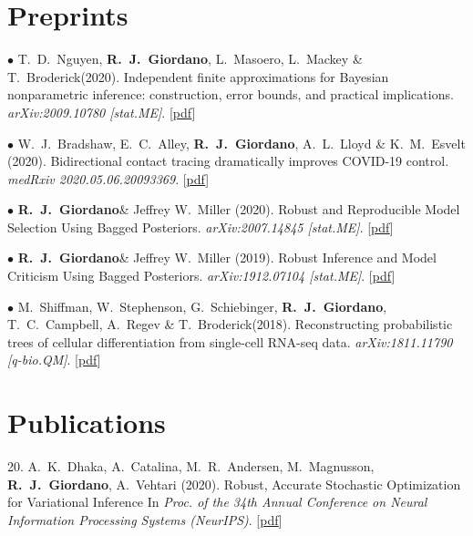 \documentclass[margin,line]{res}
\newcommand{\me}{\textbf{R.~J.~Giordano}\xspace}
\newcommand{\trevor}{T.~C.~Campbell\xspace}
\newcommand{\tamara}{T.~Broderick\xspace}
\newcommand{\paperref}[1]{[\href{#1}{pdf}]}
\newcommand{\paperref}[1]{}
\begin{document}
\begin{resume}
%
%


\section{\sc Preprints}

$\bullet$ T.~D.~Nguyen, \me, L.~Masoero, L.~Mackey \& \tamara (2020).
Independent finite approximations for Bayesian nonparametric inference: construction, error bounds, and practical implications.
\emph{arXiv:2009.10780 [stat.ME]}.
\paperref{https://arxiv.org/abs/2009.10780}

$\bullet$ W.\ J.\ Bradshaw, E.\ C.\ Alley, \me, A.\ L.\ Lloyd \& K.\ M.\ Esvelt (2020).
Bidirectional contact tracing dramatically improves COVID-19 control.
\emph{medRxiv 2020.05.06.20093369}.
\paperref{https://doi.org/10.1101/2020.05.06.20093369}

$\bullet$ \me \& Jeffrey W.~Miller (2020).
Robust and Reproducible Model Selection Using Bagged Posteriors.
\emph{arXiv:2007.14845 [stat.ME]}.
\paperref{https://arxiv.org/abs/2007.14845}

$\bullet$ \me \& Jeffrey W.~Miller (2019).
Robust Inference and Model Criticism Using Bagged Posteriors.
\emph{arXiv:1912.07104 [stat.ME]}.
\paperref{https://arxiv.org/abs/1912.07104}

$\bullet$ M.~Shiffman, W.~Stephenson, G.~Schiebinger,  \me,  \trevor, A.~Regev \& \tamara  (2018).
Reconstructing probabilistic trees of cellular differentiation from single-cell RNA-seq data.
\emph{arXiv:1811.11790 [q-bio.QM]}.
\paperref{https://arxiv.org/abs/1811.1179}



\section{\sc Publications}

20. A.~K.~Dhaka, A.~Catalina, M.~R.~Andersen, M.~Magnusson, \me, A.~Vehtari (2020).
Robust, Accurate Stochastic Optimization for Variational Inference
In \emph{Proc. of the 34th Annual Conference on Neural Information Processing Systems (NeurIPS)}.
\paperref{https://arxiv.org/abs/2009.00666}


\end{resume}
\end{document}

